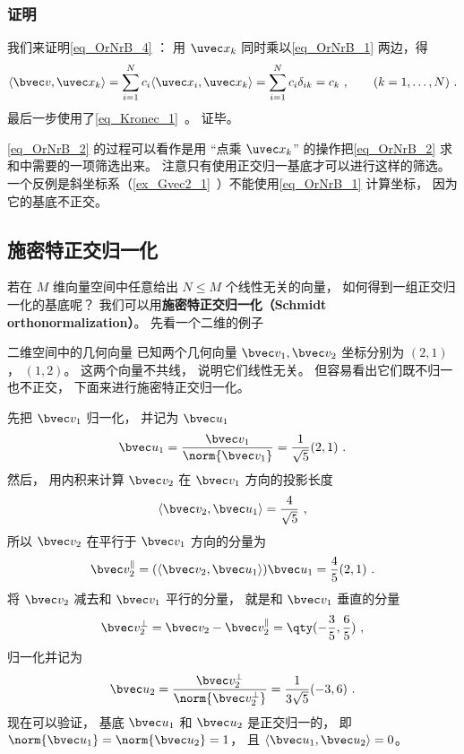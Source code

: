 \subsubsection{证明}
我们来证明\autoref{eq_OrNrB_4} ： 用 $\uvec x_k$ 同时乘以\autoref{eq_OrNrB_1} 两边，得
\begin{equation}\label{eq_OrNrB_2}
\langle \bvec v, \uvec x_k \rangle = \sum_{i = 1}^N  c_i \langle \uvec x_i, \uvec x_k \rangle = \sum_{i = 1}^N c_i \delta_{ik}  = c_k ~,\qquad (k = 1, \dots, N)~.
\end{equation}
最后一步使用了\autoref{eq_Kronec_1}~。 证毕。

\autoref{eq_OrNrB_2} 的过程可以看作是用 “点乘 $\uvec x_k$” 的操作把\autoref{eq_OrNrB_2} 求和中需要的一项筛选出来。 注意只有使用正交归一基底才可以进行这样的筛选。 一个反例是斜坐标系（\autoref{ex_Gvec2_1}~）不能使用\autoref{eq_OrNrB_1} 计算坐标， 因为它的基底不正交。


\subsection{施密特正交归一化}

若在 $M$ 维向量空间中任意给出 $N \leqslant M$ 个线性无关的向量， 如何得到一组正交归一化的基底呢？ 我们可以用\textbf{施密特正交归一化（Schmidt orthonormalization）}。 先看一个二维的例子

\begin{example}{二维空间中的几何向量}
已知两个几何向量 $\bvec v_1, \bvec v_2$ 坐标分别为 $(2, 1)$， $(1, 2)$。 这两个向量不共线， 说明它们线性无关。 但容易看出它们既不归一也不正交， 下面来进行施密特正交归一化。

先把 $\bvec v_1$ 归一化， 并记为 $\bvec u_1$
\begin{equation}
\bvec u_1 = \frac{\bvec v_1}{\norm{\bvec v_1}} = \frac{1}{\sqrt{5}} (2, 1)~.
\end{equation}
然后， 用内积来计算 $\bvec v_2$ 在 $\bvec v_1$ 方向的投影长度
\begin{equation}
\langle \bvec v_2, \bvec u_1 \rangle = \frac{4}{\sqrt{5}}~,
\end{equation}
所以 $\bvec v_2$ 在平行于 $\bvec v_1$ 方向的分量为
\begin{equation}
\bvec v_2^\parallel =  (\langle \bvec v_2, \bvec u_1 \rangle)\bvec u_1 = \frac{4}{5} (2, 1)~.
\end{equation}
将 $\bvec v_2$ 减去和 $\bvec v_1$ 平行的分量， 就是和 $\bvec v_1$ 垂直的分量
\begin{equation}
\bvec v_2^\bot = \bvec v_2 - \bvec v_2^\parallel = \qty(-\frac35, \frac65)~,
\end{equation}
归一化并记为
\begin{equation}
\bvec u_2 = \frac{\bvec v_2^\bot}{\norm{\bvec v_2^\bot}} = \frac{1}{3\sqrt{5}} (-3, 6)~.
\end{equation}
现在可以验证， 基底 $\bvec u_1$ 和 $\bvec u_2$ 是正交归一的， 即 $\norm{\bvec u_1} = \norm{\bvec u_2} = 1$， 且 $\langle \bvec u_1, \bvec u_2 \rangle = 0$。
\end{example}

